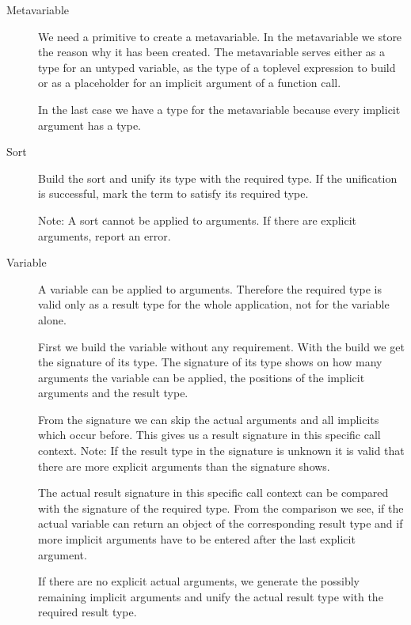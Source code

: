 \begin{description}

\item [Metavariable] We need a primitive to create a metavariable. In the
    metavariable we store the reason why it has been created. The metavariable
        serves either as a type for an untyped variable, as the type of a
        toplevel expression to build or as a placeholder for an implicit
        argument of a function call.

        In the last case we have a type for the metavariable because every
        implicit argument has a type.


\item [Sort]
    Build the sort and unify its type with the required type. If the unification
        is successful, mark the term to satisfy its required type.

        Note: A sort cannot be applied to arguments. If there are explicit
        arguments, report an error.

\item [Variable]
    A variable can be applied to arguments. Therefore the required type is valid
        only as a result type for the whole application, not for the variable
        alone.

        First we build the variable without any requirement. With the build we
        get the signature of its type. The signature of its type shows on how
        many arguments the variable can be applied, the positions of the
        implicit arguments and the result type.

        From the signature we can skip the actual arguments and all implicits
        which occur before. This gives us a result signature in this specific
        call context. Note: If the result type in the signature is unknown it is
        valid that there are more explicit arguments than the signature shows.

        The actual result signature in this specific call context can be
        compared with the signature of the required type. From the comparison we
        see, if the actual variable can return an object of the corresponding
        result type and if more implicit arguments have to be entered after the
        last explicit argument.

        If there are no explicit actual arguments, we generate the possibly
        remaining implicit arguments and unify the actual result type with the
        required result type.



\end{description}
